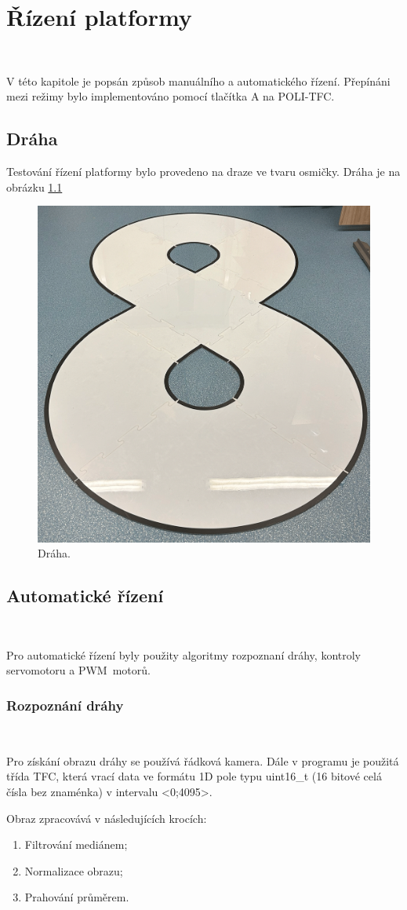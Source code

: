 \chapter{Řízení platformy}
\label{sec:PlatformControl}
\

V této kapitole je popsán způsob manuálního a automatického řízení.
Přepínáni mezi režimy bylo implementováno
pomocí tlačítka A na POLI-TFC.

\section{Dráha}
Testování řízení platformy bylo provedeno na draze ve tvaru osmičky.
Dráha je na obrázku \ref{fig:Road}

\begin{figure}[!h]
    \centering
    \includegraphics[width = 0.5\linewidth]{Figures/Road.png}
    \caption{Dráha.}
    \label{fig:Road}
\end{figure}

\section{Automatické řízení}\

Pro automatické řízení byly použity algoritmy rozpoznaní dráhy,
kontroly servomotoru a PWM~motorů.

\subsection{Rozpoznání dráhy}\

Pro získání obrazu dráhy se používá řádková kamera. Dále v programu
je použitá třída TFC\cite{draha}, která vrací data ve formátu 1D pole
typu uint16\_t (16 bitové celá čísla bez znaménka) v intervalu <0;4095>.

Obraz zpracovává v následujících krocích:
\begin{enumerate}
    \item Filtrování mediánem;
    \item Normalizace obrazu;
    \item Prahování průměrem.
\end{enumerate}

